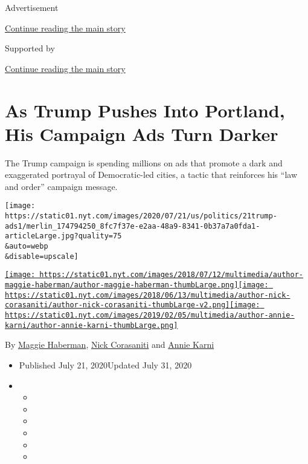 Advertisement

\protect\hyperlink{after-top}{Continue reading the main story}

Supported by

\protect\hyperlink{after-sponsor}{Continue reading the main story}

\hypertarget{as-trump-pushes-into-portland-his-campaign-ads-turn-darker}{%
\section{As Trump Pushes Into Portland, His Campaign Ads Turn
Darker}\label{as-trump-pushes-into-portland-his-campaign-ads-turn-darker}}

The Trump campaign is spending millions on ads that promote a dark and
exaggerated portrayal of Democratic-led cities, a tactic that reinforces
his ``law and order'' campaign message.

\texttt{[image: https://static01.nyt.com/images/2020/07/21/us/politics/21trump-ads1/merlin\_174794250\_8fc7f37e-e2aa-48a9-8341-0b37a7a0fda1-articleLarge.jpg?quality=75\\\&auto=webp\\\&disable=upscale]}

\href{https://www.nytimes.com/by/maggie-haberman}{\texttt{[image: https://static01.nyt.com/images/2018/07/12/multimedia/author-maggie-haberman/author-maggie-haberman-thumbLarge.png]}}\href{https://www.nytimes.com/by/nick-corasaniti}{\texttt{[image: https://static01.nyt.com/images/2018/06/13/multimedia/author-nick-corasaniti/author-nick-corasaniti-thumbLarge-v2.png]}}\href{https://www.nytimes.com/by/annie-karni}{\texttt{[image: https://static01.nyt.com/images/2019/02/05/multimedia/author-annie-karni/author-annie-karni-thumbLarge.png]}}

By \href{https://www.nytimes.com/by/maggie-haberman}{Maggie Haberman},
\href{https://www.nytimes.com/by/nick-corasaniti}{Nick Corasaniti} and
\href{https://www.nytimes.com/by/annie-karni}{Annie Karni}

\begin{itemize}
\item
  Published July 21, 2020Updated July 31, 2020
\item
  \begin{itemize}
  \item
  \item
  \item
  \item
  \item
  \item
  \end{itemize}
\end{itemize}

